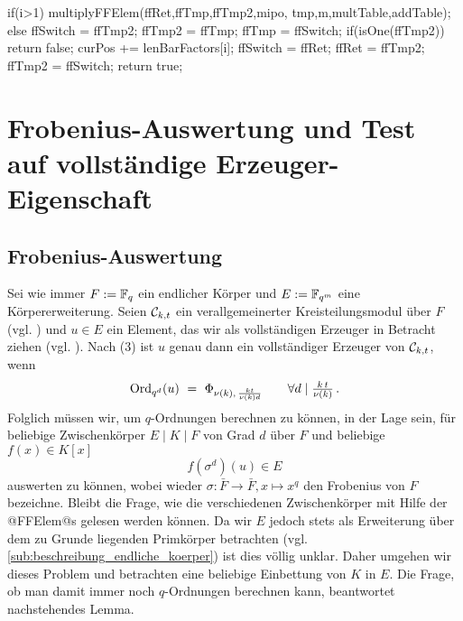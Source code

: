 \begin{ccode}[caption={[\texttt{bool isPrimitive} aus 
 \url{../Sage/enumeratePCNs.c}]Aus \url{../Sage/enumeratePCNs.c}},
  label=lst:isPrimitive]
{{        if(i>1){
            multiplyFFElem(ffRet,ffTmp,ffTmp2,mipo,
                    tmp,m,multTable,addTable);
        }else{
            ffSwitch = ffTmp2; ffTmp2 = ffTmp; ffTmp = ffSwitch;
        }
        if(isOne(ffTmp2)) return false;
        curPos += lenBarFactors[i];
        ffSwitch = ffRet; ffRet = ffTmp2; ffTmp2 = ffSwitch;
    }
    return true;
}
\end{ccode}

\section{Frobenius-Auswertung und Test auf vollständige
  Erzeuger-Eigenschaft}

\subsection{Frobenius-Auswertung}

Sei wie immer $F := \mathbb{F}_q$ ein endlicher Körper und $E := \mathbb{F}_{q^m}$ eine
Körpererweiterung. Seien $\mathcal{C}_{k,t}$ ein verallgemeinerter
Kreisteilungsmodul über $F$ (vgl.
) und 
$u\in E$ ein Element, das wir als vollständigen Erzeuger 
in Betracht ziehen (vgl. ). Nach 
 (3) ist $u$ genau dann ein vollständiger 
Erzeuger von $\mathcal{C}_{k,t}$, wenn
\[ \operatorname{Ord}_{q^d}(u) \ =\  \Phi_{\nu(k),\, \frac{kt}{\nu(k)d}} \qquad
  \forall d \mid \tfrac{k\,t}{\nu(k)}\,.\]
Folglich müssen wir, um $q$-Ordnungen berechnen zu können, in der Lage sein,
für beliebige Zwischenkörper $E\mid K\mid F$ von Grad $d$ über $F$ und beliebige 
$f(x) \in K[x]$ 
\[ f(\sigma^d)(u) \in E\]
auswerten zu können, wobei wieder $\sigma: \bar F\to \bar F, x \mapsto x^q$ den
Frobenius von $F$ bezeichne. Bleibt die Frage, wie die verschiedenen
Zwischenkörper mit Hilfe der @FFElem@s gelesen werden können. Da wir $E$ jedoch
stets als Erweiterung über dem zu Grunde liegenden Primkörper betrachten 
(vgl. \autoref{sub:beschreibung_endliche_koerper}) ist dies völlig unklar.
Daher umgehen wir dieses Problem und betrachten eine beliebige Einbettung von
$K$ in $E$. Die Frage, ob man damit immer noch $q$-Ordnungen berechnen kann,
beantwortet nachstehendes Lemma.

